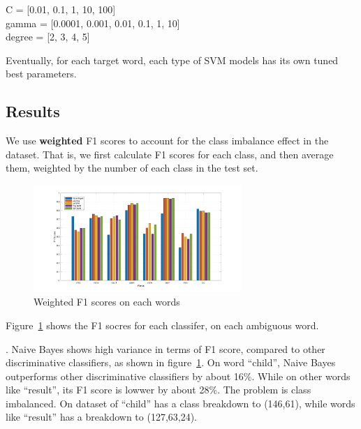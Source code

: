 C = [0.01, 0.1, 1, 10, 100] \\
gamma = [0.0001, 0.001, 0.01, 0.1, 1, 10] \\
degree = [2, 3, 4, 5]

Eventually, for each target word, each type of SVM models has its own tuned best
parameters.

\subsection{Results}
\label{sec:eval:results}

We use \textbf{weighted} F1 scores to account for the class imbalance effect in
the dataset. 
That is, we first calculate F1 scores for each class, and then average them,
weighted by the number of each class in the test set.

\begin{figure}[h]
  \centering 
  \includegraphics[width=0.7\textwidth]{plots/f1.jpg}
    \caption{Weighted F1 scores on each words}
    \label{fig:results:f1}
\end{figure}

Figure~\ref{fig:results:f1} shows the F1 socres for each classifer,
on each ambiguous word.

.
Naive Bayes shows high variance in terms of F1 score, compared to other
discriminative classifiers, as shown in figure~\ref{fig:results:f1}.
On word ``child'', Naive Bayes outperforms other discriminative classifiers by
about 16\%.
While on other words like ``result'', its F1 score is lowwer by about 28\%.
The problem is class imbalanced. 
On dataset of ``child'' has a class breakdown to (146,61), while words like
``result'' has a breakdown to (127,63,24).
